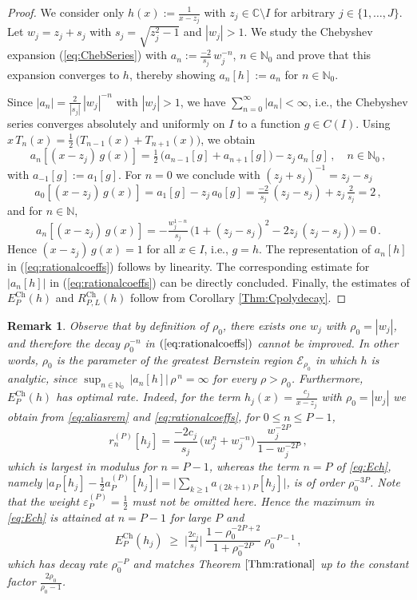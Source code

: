 \documentclass[11pt,a4paper]{scrartcl}
\newtheorem{remark}[theorem]{Remark}
\numberwithin{equation}{section}
\numberwithin{table}{section}
\numberwithin{figure}{section}
\newcommand{\C}{\mathbb C}
\newcommand{\N}{\mathbb N}
\newcommand{\Np}{{\mathbb N}_0}
\newcommand{\Ech}{E^{\mathrm{Ch}}}
\newcommand{\Rch}{R^{\mathrm{Ch}}}
\begin{document}
\begin{proof}
We consider only  $h(x):= \frac{1}{x-z_j}$ with $z_j \in\C\setminus I$ for arbitrary $j \in \{1,\ldots,J\}$. Let $w_j = z_j+ s_j$ with $s_j =\sqrt{z_j^2-1}$ and $|w_j| >1$.
We study the Chebyshev expansion (\ref{eq:ChebSeries}) with $a_n:=
\tfrac{-2}{s_j}\,w_j^{-n}$, $n \in \Np$  and prove that this expansion converges to $h$, thereby showing
$a_n[h]:=
a_n$ for $n \in \Np$.

Since $|a_n| = \frac{2}{|s_j|}\,|w_j|^{-n}$ with $|w_j|>1$, we have $\sum_{n=0}^\infty |a_n| < \infty$, i.e.,
the Chebyshev series converges absolutely and uniformly on $I$ to a function
$g \in C(I)$. Using $x\,T_n(x) = \tfrac12\,\big(T_{n-1}(x) + T_{n+1}(x)\big)$,
we obtain
$$ \textstyle a_n[(x- z_j)\,g(x)] = \tfrac12\,\big(a_{n-1}[g] + a_{n+1}[g]\big) -
z_j\,a_n[g]\,,  \quad n \in \Np\,, $$
with $a_{-1}[g] := a_1[g]$. For $n=0$ we conclude with $(z_j + s_j)^{-1} = z_j - s_j$
$$
\textstyle a_0[(x- z_j)\,g(x)] = a_1[g] - z_j\,a_0[g] = \tfrac{-2}{s_j}\,(z_j - s_j) + z_j\,\tfrac{2}{s_j} = 2\,,
$$
and for $n \in \N$,
$$
a_n[(x- z_j)\,g(x)] = - \tfrac{w_j^{1-n}}{s_j}\,\big(1 + (z_j - s_j)^2 - 2 z_j\,(z_j - s_j)\big) = 0\,.
$$
Hence $(x- z_j)\,g(x) = 1$ for all $x \in I$, i.e., $g = h$.
The representation of $a_n[h]$ in (\ref{eq:rationalcoeffs}) follows by linearity. The corresponding
estimate for  $|a_n[h]|$ in (\ref{eq:rationalcoeffs})
can be directly concluded. Finally, the estimates of $\Ech_{P}(h)$ and $\Rch_{P,L}(h)$ follow from Corollary \ref{Thm:Cpolydecay}.
\end{proof}

\begin{remark}
Observe that by definition of $\rho_0$,  there exists one $w_j$ with $\rho_0 = |w_j|$, and therefore
the decay $\rho_0^{-n}$  in $(\ref{eq:rationalcoeffs})$ cannot be improved.
In other words, $\rho_0$ is the parameter of the greatest Bernstein region ${\mathcal E}_{\rho_0}$ in which
$h$ is analytic,  since $\sup_{n\in\Np}\,|a_n[h]|\,\rho^{\,n}=\infty$ for every $\rho > \rho_0$.
Furthermore, $\Ech_{P}(h)$ has optimal rate. Indeed, for the term $h_j(x)=\frac{c_j}{x-z_j}$ with
$\rho_0=|w_j|$ we obtain from \eqref{eq:aliasrem} and \eqref{eq:rationalcoeffs}, for
$0 \le n \le P-1$,
$$
\textstyle r_n^{(P)}[h_j] = \frac{-2c_j}{s_j}\,\big(w_j^{n}+w_j^{-n}\big)\,\frac{w_j^{-2P}}{1-w_j^{-2P}}\,,
$$
which is largest in modulus for $n=P-1$, whereas the term $n=P$ of \eqref{eq:Ech}, namely
$\big|a_P[h_j]-\frac12 a_P^{(P)}[h_j]\big| = \big|\sum_{k\ge1}a_{(2k+1)P}[h_j]\big|$, is of order
$\rho_0^{-3P}$.  Note that the weight $\varepsilon_P^{(P)}=\frac12$ must not be omitted here. Hence
the maximum in \eqref{eq:Ech} is attained at $n=P-1$ for large $P$ and
$$
\textstyle \Ech_P(h_j) \;\ge\; \big|\tfrac{2c_j}{s_j}\big|\;\frac{1-\rho_0^{-2P+2}}{1+\rho_0^{-2P}}\;\rho_0^{-P-1}\,,
$$
which has decay rate $\rho_0^{-P}$ and matches Theorem $\ref{Thm:rational}$ up to the constant
factor $\frac{2\rho_0}{\rho_0-1}$.
\end{remark}
	
\end{document}
